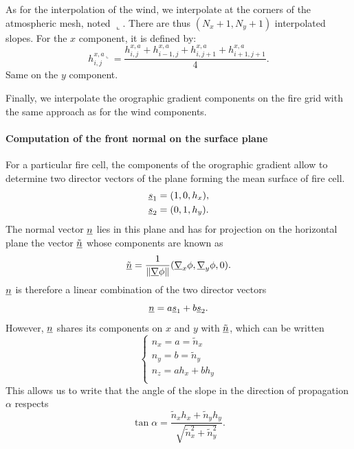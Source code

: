 As for the interpolation of the wind, we interpolate at the corners of the atmospheric mesh, noted $\llcorner$. There are thus $(N_x +1, N_y+1)$ interpolated slopes. For the $x$ component, it is defined by:
\begin{equation}
  h_{i,j}^{x,a\llcorner} = \frac{h_{i,j}^{x,a} + h_{i-1,j}^{x,a} + h_{i,j+1}^{x,a} + h_{i+1,j+1}^{x,a}}{4}.
\end{equation}
Same on the $y$ component.

Finally, we interpolate the orographic gradient components on the fire grid with the same approach as for the wind components. 

\paragraph{Computation of the front normal on the surface plane}
For a particular fire cell, the components of the orographic gradient allow to determine two director vectors of the plane forming the mean surface of fire cell.
\begin{align}
	\underline{s}_1 &= ( 1, 0, h_x ), \\
	\underline{s}_2 &= (0,1,h_y).
\end{align}
The normal vector $\underline{n}$ lies in this plane and has for projection on the horizontal plane the vector $\underline{\tilde n}$ whose components are known as
\begin{equation}
  \underline{\tilde n} = \frac{1}{\| \underline{\nabla} \phi \|} (\underline{\nabla}_x \phi, \underline{\nabla}_y \phi, 0 ).
\end{equation}
$\underline{n}$ is therefore a linear combination of the two director vectors
\begin{equation}
  \underline{n} = a \underline{s}_1 + b \underline{s}_2.
\end{equation}
However, $\underline{n}$ shares its components on $x$ and $y$ with $\underline{\tilde n}$, which can be written
\begin{equation}
  \begin{cases}
  	n_x = a = \tilde n_x \\
  	n_y = b = \tilde n_y \\
  	n_z = a h_x + b h_y \\
  \end{cases}
\end{equation}
This allows us to write that the angle of the slope in the direction of propagation $\alpha$ respects
\begin{equation}
  \tan \alpha = \frac{\tilde n_x h_x + \tilde n_y h_y}{\sqrt{\tilde n_x^2 + \tilde n_y^2}}.
\end{equation}
